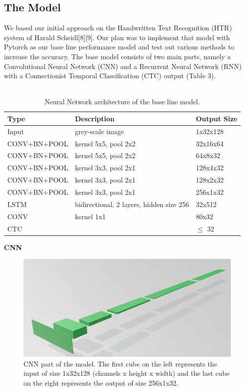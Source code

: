 \documentclass{article}
\begin{document}
\subsection{The Model}
We based our initial approach on the Handwritten Text Recognition (HTR) system of Harald Scheidl[8][9]. Our plan was to implement that model with Pytorch as our base line performance model and test out various methods to increase the accuracy. The base model consists of two main parts, namely a Convolutional Neural Network (CNN) and a Recurrent Neural Network (RNN) with a Connectionist Temporal Classification (CTC) output (Table 3).\\\\
\begin{table}[H]
\centering
\begin{tabular}{l|l|l}
Type & Description & Output Size \\ \hline
Input & grey-scale image & 1x32x128 \\ \hline
CONV+BN+POOL & kernel 5x5, pool 2x2 & 32x16x64 \\ \hline
CONV+BN+POOL & kernel 5x5, pool 2x2 & 64x8x32 \\ \hline
CONV+BN+POOL & kernel 3x3, pool 2x1 & 128x4x32 \\ \hline
CONV+BN+POOL & kernel 3x3, pool 2x1 & 128x2x32 \\ \hline
CONV+BN+POOL & kernel 3x3, pool 2x1 & 256x1x32 \\ \hline
LSTM         & bidirectional, 2 layers, hidden size 256 & 32x512 \\ \hline
CONV         & kernel 1x1 & 80x32 \\ \hline
CTC          &      & \(\leqslant\) 32 \\ \hline
\end{tabular}
\caption{Neural Network architecture of the base line model.}
\end{table}
\textbf{CNN}\\
\begin{figure}[H]
\begin{center}
\includegraphics[scale=0.3]{CNN}
\end{center}
\caption{CNN part of the model. The first cube on the left represents the input of size 1x32x128 (channels x height x width) and the last cube on the right represents the output of size 256x1x32.}
\end{figure}
\end{document}
